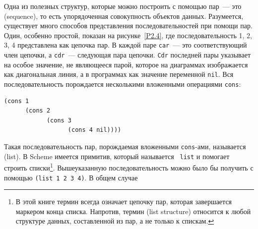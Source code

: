 Одна из полезных структур, которые можно построить с 
помощью пар~--- это  (sequence), то есть
упорядоченная совокупность объектов данных.  Разумеется, существует много
способов представления последовательностей при помощи пар.  Один,
особенно простой, показан на рисунке~\ref{P2.4}, где
последовательность 1, 2, 3, 4 представлена как цепочка пар. В каждой
паре {\tt car}~--- это соответствующий член цепочки, а
{\tt cdr}~--- следующая пара цепочки.  {\tt Cdr}
последней пары указывает на особое значение, не являющееся парой,
которое на диаграммах изображается как диагональная линия, а в
программах 
как значение переменной {\tt nil}. 
Вся последовательность порождается несколькими вложенными операциями
{\tt cons}:

\begin{Verbatim}[fontsize=\small]
(cons 1
      (cons 2
            (cons 3
                  (cons 4 nil))))
\end{Verbatim}

\begin{cntrfig}

\caption{Последовательность 1, 2, 3, 4,
представленная в виде цепочки пар.}
\label{P2.4}

\end{cntrfig}

Такая последовательность пар, порождаемая вложенными
{\tt cons}-ами, называется  (list). 
В Scheme имеется примитив, который называется {\tt
  list}
и помогает строить списки\footnote{В этой книге термин
  всегда означает цепочку пар, которая завершается маркером конца
  списка.  Напротив, термин    (list structure) относится к любой структуре данных, составленной из
пар, а не только к спискам.}.
Вышеуказанную последовательность можно было бы получить с помощью
{\tt (list 1 2 3 4)}. В общем случае

